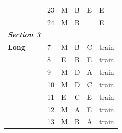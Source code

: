 \documentclass[pageno]{final_paper}
\newcommand{\textbi}[1]{\textbf{\textit{#1}}}
\begin{document}
\begin{table}[t]
\begin{tabular}{llllll}
\textbf{}                & 23                                  & M                                       & B                                           & E                                          & E                                           \\
\textbf{}                & 24                                  & M                                       & B                                           & \g{B}                                          & E                                           \\ \midrule
\textbi{Section 3}       &                                     &                                         &                                             &                                            &                                             \\ \midrule
\textbf{Long}            & 7                                   & M                                       & B                                           & C                                          & train                                       \\
\textbf{}                & 8                                   & E                                       & B                                           & E                                          & train                                       \\
\textbf{}                & 9                                   & M                                       & D                                           & A                                          & train                                       \\
\textbf{}                & 10                                  & M                                       & D                                           & C                                          & train                                       \\
\textbf{}                & 11                                  & E                                       & C                                           & E                                          & train                                       \\
\textbf{}                & 12                                  & M                                       & A                                           & E                                          & train                                       \\
\textbf{}                & 13                                  & M                                       & B                                           & A                                          & train                                       \\

\end{tabular}
\end{table}
\end{document}
